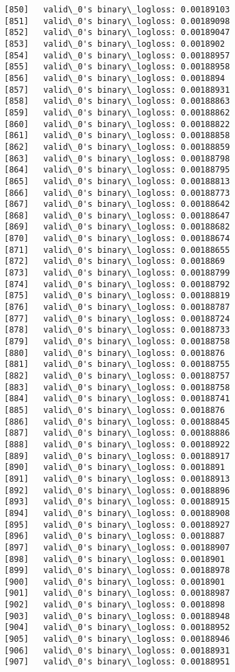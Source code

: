 \documentclass[11pt]{article}
\begin{document}
\begin{Verbatim}[commandchars=\\\{\}]
[850]	valid\_0's binary\_logloss: 0.00189103
[851]	valid\_0's binary\_logloss: 0.00189098
[852]	valid\_0's binary\_logloss: 0.00189047
[853]	valid\_0's binary\_logloss: 0.0018902
[854]	valid\_0's binary\_logloss: 0.00188957
[855]	valid\_0's binary\_logloss: 0.00188958
[856]	valid\_0's binary\_logloss: 0.0018894
[857]	valid\_0's binary\_logloss: 0.00188931
[858]	valid\_0's binary\_logloss: 0.00188863
[859]	valid\_0's binary\_logloss: 0.00188862
[860]	valid\_0's binary\_logloss: 0.00188822
[861]	valid\_0's binary\_logloss: 0.00188858
[862]	valid\_0's binary\_logloss: 0.00188859
[863]	valid\_0's binary\_logloss: 0.00188798
[864]	valid\_0's binary\_logloss: 0.00188795
[865]	valid\_0's binary\_logloss: 0.00188813
[866]	valid\_0's binary\_logloss: 0.00188773
[867]	valid\_0's binary\_logloss: 0.00188642
[868]	valid\_0's binary\_logloss: 0.00188647
[869]	valid\_0's binary\_logloss: 0.00188682
[870]	valid\_0's binary\_logloss: 0.00188674
[871]	valid\_0's binary\_logloss: 0.00188655
[872]	valid\_0's binary\_logloss: 0.0018869
[873]	valid\_0's binary\_logloss: 0.00188799
[874]	valid\_0's binary\_logloss: 0.00188792
[875]	valid\_0's binary\_logloss: 0.00188819
[876]	valid\_0's binary\_logloss: 0.00188787
[877]	valid\_0's binary\_logloss: 0.00188724
[878]	valid\_0's binary\_logloss: 0.00188733
[879]	valid\_0's binary\_logloss: 0.00188758
[880]	valid\_0's binary\_logloss: 0.0018876
[881]	valid\_0's binary\_logloss: 0.00188755
[882]	valid\_0's binary\_logloss: 0.00188757
[883]	valid\_0's binary\_logloss: 0.00188758
[884]	valid\_0's binary\_logloss: 0.00188741
[885]	valid\_0's binary\_logloss: 0.0018876
[886]	valid\_0's binary\_logloss: 0.00188845
[887]	valid\_0's binary\_logloss: 0.00188886
[888]	valid\_0's binary\_logloss: 0.00188922
[889]	valid\_0's binary\_logloss: 0.00188917
[890]	valid\_0's binary\_logloss: 0.0018891
[891]	valid\_0's binary\_logloss: 0.00188913
[892]	valid\_0's binary\_logloss: 0.00188896
[893]	valid\_0's binary\_logloss: 0.00188915
[894]	valid\_0's binary\_logloss: 0.00188908
[895]	valid\_0's binary\_logloss: 0.00188927
[896]	valid\_0's binary\_logloss: 0.0018887
[897]	valid\_0's binary\_logloss: 0.00188907
[898]	valid\_0's binary\_logloss: 0.0018901
[899]	valid\_0's binary\_logloss: 0.00188978
[900]	valid\_0's binary\_logloss: 0.0018901
[901]	valid\_0's binary\_logloss: 0.00188987
[902]	valid\_0's binary\_logloss: 0.0018898
[903]	valid\_0's binary\_logloss: 0.00188948
[904]	valid\_0's binary\_logloss: 0.00188952
[905]	valid\_0's binary\_logloss: 0.00188946
[906]	valid\_0's binary\_logloss: 0.00188931
[907]	valid\_0's binary\_logloss: 0.00188951

\end{Verbatim}
\end{document}
